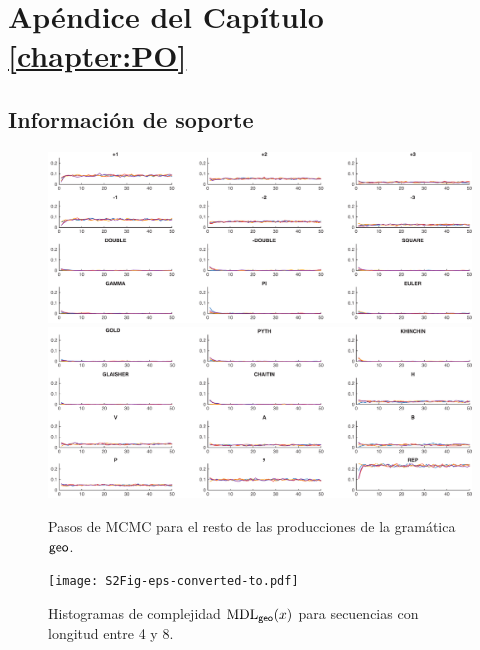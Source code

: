 \chapter{Apéndice del Capítulo \ref{chapter:PO}}\label{app:PO}

\section{Información de soporte}

\begin{figure}[htpb]
    \centering
    \hbox{\hspace{-2.5em}\includegraphics[width=1.2\textwidth]{figuras/plosone/S1Fig-eps-converted-to-a.pdf}}
    \hbox{\hspace{-2.5em}\includegraphics[width=1.2\textwidth]{figuras/plosone/S1Fig-eps-converted-to-b.pdf}}
    \caption{Pasos de MCMC para el resto de las producciones de la gramática ${\sf geo}$.}
    \label{S1_Fig}
\end{figure}

\begin{figure}[htpb]
    \centering
    \hbox{\hspace{-2.5em}\texttt{[image: S2Fig-eps-converted-to.pdf]}}
    \caption{Histogramas de complejidad ${\rm MDL}_{{\sf geo}}(x)$ para secuencias con longitud entre 4 y 8.}
    \label{S2_Fig}
\end{figure}

